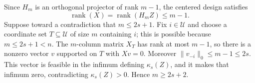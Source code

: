 Since \(H_m\) is an orthogonal projector of rank \(m-1\), the centered design satisfies
\[
 \operatorname{rank}(X)=\operatorname{rank}(H_mZ)\le m-1.
\]
Suppose toward a contradiction that \(m\le2s+1\).  Fix \(i\in\mathcal U\) and choose a coordinate set \(T\subseteq\mathcal U\) of size \(m\) containing \(i\); this is possible because \(m\le2s+1<n\).  The \(m\)-column matrix \(X_T\) has rank at most \(m-1\), so there is a nonzero vector \(v\) supported on \(T\) with \(Xv=0\).  Moreover \(\lVert v_{-i}\rVert_0\le m-1\le2s\).  This vector is feasible in the infimum defining \(\kappa_s(Z)\), and it makes that infimum zero, contradicting \(\kappa_s(Z)>0\).  Hence \(m\ge2s+2\).
